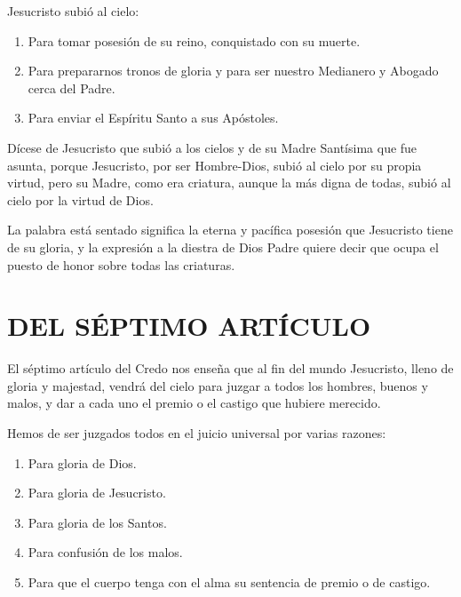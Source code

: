  Jesucristo subió al cielo: 

\begin{enumerate}
	\item Para tomar posesión de su reino, conquistado con su muerte.
	\item Para prepararnos tronos de gloria y para ser nuestro Medianero y Abogado cerca del Padre.
	\item Para enviar el Espíritu Santo a sus Apóstoles.
\end{enumerate}

 Dícese de Jesucristo que subió a los cielos y de su
Madre Santísima que fue asunta, porque Jesucristo, por ser Hombre-Dios, subió
al cielo por su propia virtud, pero su Madre, como era criatura, aunque la más
digna de todas, subió al cielo por la virtud de Dios.

 La palabra está sentado significa la eterna y pacífica posesión que
Jesucristo tiene de su gloria, y la expresión a la diestra de Dios Padre quiere decir que ocupa el puesto de honor sobre todas las criaturas.

\section{DEL SÉPTIMO ARTÍCULO}

 El séptimo artículo del
Credo nos enseña que al fin del mundo Jesucristo, lleno de gloria y majestad,
vendrá del cielo para juzgar a todos los hombres, buenos y malos, y dar a cada
uno el premio o el castigo que hubiere merecido.

 Hemos de ser juzgados todos en el juicio
universal por varias razones:

\begin{enumerate}
	\item Para gloria de Dios.
	\item Para gloria de Jesucristo.
	\item Para gloria de los Santos.
	\item Para confusión de los malos.
	\item Para que el cuerpo tenga con el alma su sentencia de premio o de castigo.
\end{enumerate}

